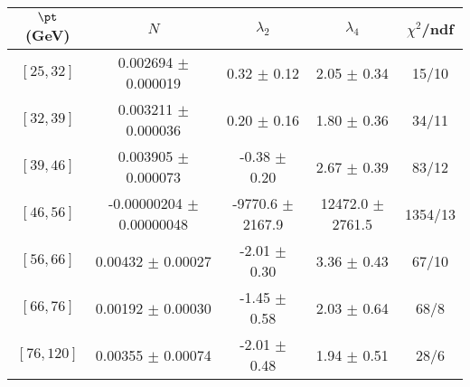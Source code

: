 \begin{tabular}{c||c|c|c|c}
$\pt$ (GeV) & $N$ & $\lambda_{2}$ & $\lambda_4$  & $\chi^2$/ndf  \\
\hline
$[25, 32]$ & 0.002694 $\pm$ 0.000019 & 0.32 $\pm$ 0.12 & 2.05 $\pm$ 0.34 & 15/10\\
$[32, 39]$ & 0.003211 $\pm$ 0.000036 & 0.20 $\pm$ 0.16 & 1.80 $\pm$ 0.36 & 34/11\\
$[39, 46]$ & 0.003905 $\pm$ 0.000073 & -0.38 $\pm$ 0.20 & 2.67 $\pm$ 0.39 & 83/12\\
$[46, 56]$ & -0.00000204 $\pm$ 0.00000048 & -9770.6 $\pm$ 2167.9 & 12472.0 $\pm$ 2761.5 & 1354/13\\
$[56, 66]$ & 0.00432 $\pm$ 0.00027 & -2.01 $\pm$ 0.30 & 3.36 $\pm$ 0.43 & 67/10\\
$[66, 76]$ & 0.00192 $\pm$ 0.00030 & -1.45 $\pm$ 0.58 & 2.03 $\pm$ 0.64 & 68/8\\
$[76, 120]$ & 0.00355 $\pm$ 0.00074 & -2.01 $\pm$ 0.48 & 1.94 $\pm$ 0.51 & 28/6\\
\end{tabular}
